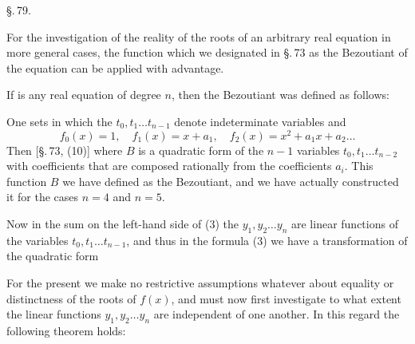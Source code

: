 
\begin{center}
\S.\,79.

\end{center}

For the investigation of the reality of the roots of an arbitrary real equation in more general cases, the function which we designated in \S.\,73 as the Bezoutiant of the equation can be applied with advantage.

If
is any real equation of degree $n$, then the Bezoutiant was defined as follows:

One sets
in which the $t_0, t_1 \ldots t_{n-1}$ denote indeterminate variables and
\[
f_0(x) = 1, \quad f_1(x) = x + a_1, \quad f_2(x) = x^2 + a_1 x + a_2 \ldots
\]
Then [\S.\,73, (10)]
where $B$ is a quadratic form of the $n - 1$ variables $t_0, t_1 \ldots t_{n-2}$ with coefficients that are composed rationally from the coefficients $a_i$. This function $B$ we have defined as the Bezoutiant, and we have actually constructed it for the cases $n = 4$ and $n = 5$.

Now in the sum on the left-hand side of (3)
the $y_1, y_2 \ldots y_n$ are linear functions of the variables $t_0, t_1 \ldots t_{n-1}$, and thus in the formula (3) we have a transformation of the quadratic form

For the present we make no restrictive assumptions whatever about equality or distinctness of the roots of $f(x)$, and must now first investigate to what extent the linear functions $y_1, y_2 \ldots y_n$ are independent of one another. In this regard the following theorem holds:
